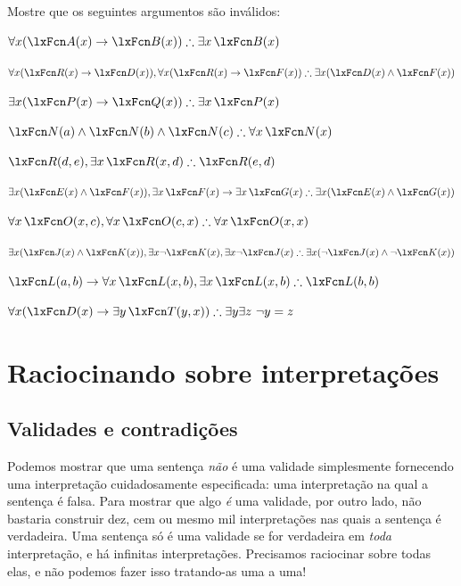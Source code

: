 \problempart
Mostre que os seguintes argumentos são inválidos:
\begin{compactlist}
\item $\forall x(\atom{A}{x} \eif \atom{B}{x}) \therefore \exists x\, \atom{B}{x}$
\item $\forall x(\atom{R}{x} \eif \atom{D}{x}), \forall x(\atom{R}{x} \eif \atom{F}{x}) \therefore \exists x(\atom{D}{x} \eand \atom{F}{x})$
\item $\exists x(\atom{P}{x}\eif \atom{Q}{x}) \therefore \exists x\, \atom{P}{x}$
\item $\atom{N}{a} \eand \atom{N}{b} \eand \atom{N}{c} \therefore \forall x\, \atom{N}{x}$
\item $\atom{R}{d,e}, \exists x\, \atom{R}{x,d} \therefore \atom{R}{e,d}$
\item $\exists x(\atom{E}{x} \eand \atom{F}{x}), \exists x\, \atom{F}{x} \eif \exists x\, \atom{G}{x} \therefore \exists x(\atom{E}{x} \eand \atom{G}{x})$
\item $\forall x\, \atom{O}{x,c}, \forall x\, \atom{O}{c,x} \therefore \forall x\, \atom{O}{x,x}$
\item $\exists x(\atom{J}{x} \eand \atom{K}{x}), \exists x \enot \atom{K}{x}, \exists x \enot \atom{J}{x} \therefore \exists x(\enot \atom{J}{x} \eand \enot \atom{K}{x})$
\item $\atom{L}{a,b} \eif \forall x\, \atom{L}{x,b}, \exists x\, \atom{L}{x,b} \therefore \atom{L}{b,b}$
\item $\forall x(\atom{D}{x} \eif \exists y\, \atom{T}{y,x}) \therefore \exists y \exists z\ \enot y= z$
\end{compactlist}

\chapter{Raciocinando sobre interpretações}

\section{Validades e contradições}
Podemos mostrar que uma sentença \emph{não} é uma validade simplesmente fornecendo uma interpretação cuidadosamente especificada: uma interpretação na qual a sentença é falsa. Para mostrar que algo \emph{é} uma validade, por outro lado, não bastaria construir dez, cem ou mesmo mil interpretações nas quais a sentença é verdadeira. Uma sentença só é uma validade se for verdadeira em \emph{toda} interpretação, e há infinitas interpretações. Precisamos raciocinar sobre todas elas, e não podemos fazer isso tratando-as uma a uma!

